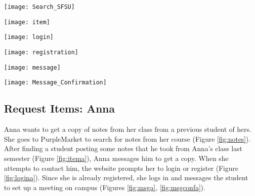 \vspace{5mm}
\begin{center}
\label{fig:sfsu}
\texttt{[image: Search\_SFSU]}
\end{center}


\pagebreak

\begin{center}
\label{fig:itemc}
\texttt{[image: item]}
\end{center}

\begin{center}
\label{fig:loginc}
\texttt{[image: login]}
\end{center}

\pagebreak

\begin{center}
\label{fig:regc}
\texttt{[image: registration]}
\end{center}

\begin{center}
\label{fig:msgc}
\texttt{[image: message]}
\end{center}

\pagebreak

\begin{center}
\label{fig:msgconfc}
\texttt{[image: Message\_Confirmation]}
\end{center}

\subsection{Request Items: Anna}
Anna wants to get a copy of notes from her class from a previous student of hers.  She goes to PurpleMarket to search for notes from her course (Figure \ref{fig:notes}).  After finding a student posting some notes that he took from Anna's class last semester (Figure \ref{fig:itema}), Anna messages him to get a copy.  When she attempts to contact him, the website prompts her to login or register (Figure \ref{fig:logina}).  Since she is already registered, she logs in and messages the student to set up a meeting on campus (Figures \ref{fig:msga}, \ref{fig:msgconfa}).


